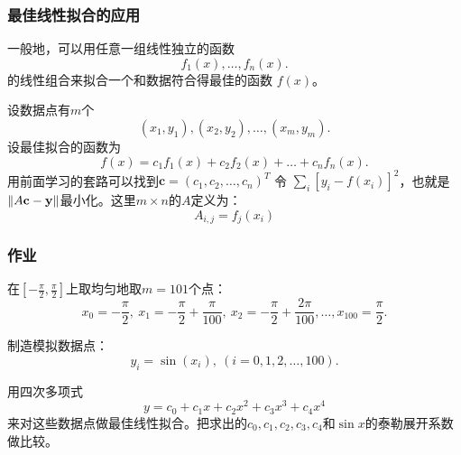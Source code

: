 \documentclass[CJK]{beamer}
\begin{document}
    \begin{frame}
      \frametitle{最佳线性拟合的应用}
      一般地，可以用任意一组线性独立的函数
      $$f_1(x), \ldots, f_{n}(x).$$
      的线性组合来拟合一个和数据符合得最佳的函数 $f(x)$。


      设数据点有$m$个
      $$(x_1, y_1), (x_2, y_2), \ldots, (x_m, y_m).$$
      设最佳拟合的函数为
      $$ f(x) = c_1 f_1(x) + c_2f_2(x) + \ldots + c_n f_n(x).$$
      用前面学习的套路可以找到$\mathbf{c} = (c_1, c_2,\ldots, c_n)^T$ 令 $\sum_i [y_i - f(x_i)]^2$，也就是$\lVert A\mathbf{c} - {\mathbf{y}}\rVert$最小化。这里$m\times n$的$A$定义为：
      $$A_{i,j} = f_j(x_i)$$
      
    \end{frame}


    \begin{frame}
      \frametitle{作业}
      在$[-\frac{\pi}{2},\frac{\pi}{2}]$上取均匀地取$m=101$个点：
      $$x_0=-\frac{\pi}{2},\ x_1 = -\frac{\pi}{2}+\frac{\pi}{100},\ x_2 = -\frac{\pi}{2}+\frac{2\pi}{100}, \ldots, x_{100} = \frac{\pi}{2}.$$

      制造模拟数据点：
      $$ y_i= \sin(x_i), \ (i=0,1,2,\ldots, 100).$$

      用四次多项式
      $$ y = c_0 + c_1x+c_2x^2+c_3x^3+c_4x^4 $$
      来对这些数据点做最佳线性拟合。把求出的$c_0,c_1,c_2,c_3,c_4$和$\sin x$的泰勒展开系数做比较。
      
    \end{frame}
  \ech
\end{document}
